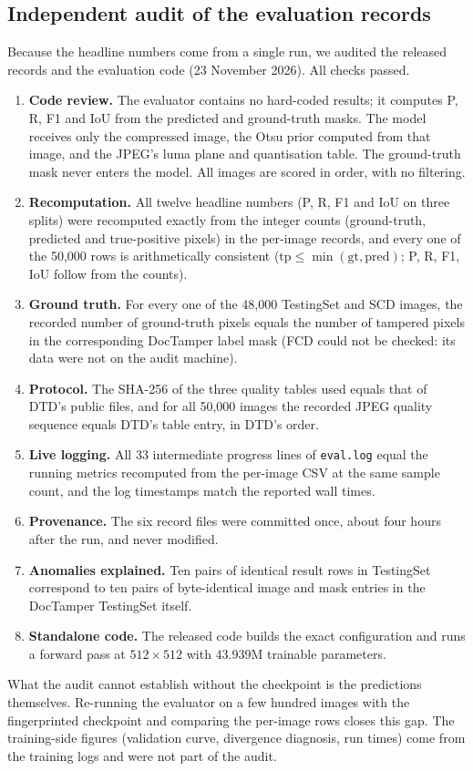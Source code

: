 \documentclass[11pt,a4paper]{article}
\begin{document}
\subsection{Independent audit of the evaluation records}
Because the headline numbers come from a single run, we audited the released records and the
evaluation code (23 November 2026). All checks passed.
\begin{enumerate}
  \item \textbf{Code review.} The evaluator contains no hard-coded results; it computes P, R, F1
        and IoU from the predicted and ground-truth masks. The model receives only the compressed
        image, the Otsu prior computed from that image, and the JPEG's luma plane and quantisation
        table. The ground-truth mask never enters the model. All images are scored in order,
        with no filtering.
  \item \textbf{Recomputation.} All twelve headline numbers (P, R, F1 and IoU on three splits)
        were recomputed exactly from the integer counts (ground-truth, predicted and true-positive
        pixels) in the per-image records, and every one of the 50{,}000 rows is arithmetically
        consistent ($\mathrm{tp}\le\min(\mathrm{gt},\mathrm{pred})$; P, R, F1, IoU follow from the
        counts).
  \item \textbf{Ground truth.} For every one of the 48{,}000 TestingSet and SCD images, the
        recorded number of ground-truth pixels equals the number of tampered pixels in the
        corresponding DocTamper label mask (FCD could not be checked: its data were not on the
        audit machine).
  \item \textbf{Protocol.} The SHA-256 of the three quality tables used equals that of DTD's public
        files, and for all 50{,}000 images the recorded JPEG quality sequence equals DTD's table
        entry, in DTD's order.
  \item \textbf{Live logging.} All 33 intermediate progress lines of \texttt{eval.log} equal the
        running metrics recomputed from the per-image CSV at the same sample count, and the log
        timestamps match the reported wall times.
  \item \textbf{Provenance.} The six record files were committed once, about four hours after the
        run, and never modified.
  \item \textbf{Anomalies explained.} Ten pairs of identical result rows in TestingSet correspond
        to ten pairs of byte-identical image and mask entries in the DocTamper TestingSet itself.
  \item \textbf{Standalone code.} The released code builds the exact configuration and runs a
        forward pass at $512\times512$ with 43.939M trainable parameters.
\end{enumerate}
\noindent What the audit cannot establish without the checkpoint is the predictions themselves.
Re-running the evaluator on a few hundred images with the fingerprinted checkpoint and comparing
the per-image rows closes this gap. The training-side figures (validation curve, divergence
diagnosis, run times) come from the training logs and were not part of the audit.
\end{document}
